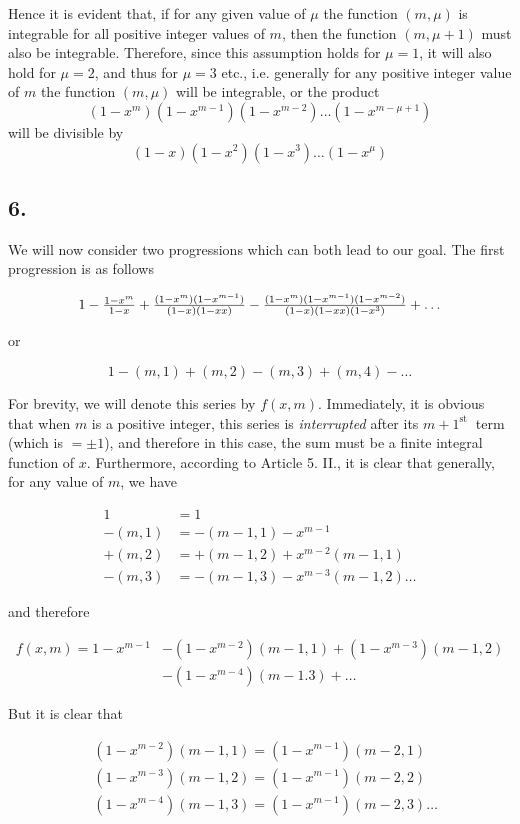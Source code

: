 \documentclass[twoside,12pt, showframe]{memoir}
\let\oldfrac\frac
\def\frac#1#2{\mathchoice{\tfrac{#1}{#2}}{\oldfrac{#1}{#2}}{\genfrac{}{}{}{2}{#1}{#2\mathstrut}}{\genfrac{}{}{}{3}{#1}{#2\mathstrut}}}
\begin{document}
Hence it is evident that, if for any given value of \(\mu\) the function \(({m}, {\mu})\) is integrable for all positive integer values of \(m\), then the function \((m, \mu+1)\) must also be integrable. Therefore, since this assumption holds for \(\mu=1\), it will also hold for \(\mu=2\), and thus for \(\mu=3\) etc., i.e. generally for any positive integer value of \(m\) the function \((m, \mu)\) will be integrable, or the product
\[(1-x^{m})(1-x^{m-1})(1-x^{m-2}) \ldots(1-x^{m-\mu+1})\]
will be divisible by
\[(1-x)(1-x^{2})(1-x^{3}) \ldots(1-x^{\mu})\]
%

\subsection*{6.}

We will now consider two progressions which can both lead to our goal. The first progression is as follows

\[1-\frac{1-x^{m}}{1-x}+\frac{(1-x^{m})(1-x^{m-1})}{(1-x)(1-xx)}-\frac{(1-x^{m})(1-x^{m-1})(1-x^{m-2})}{(1-x)(1-xx)(1-x^{3})}+\ldots\]

or

\[1-(m, 1)+(m, 2)-(m, 3)+(m, 4)-\ldots\]

For brevity, we will denote this series by \(f(x, m)\). Immediately, it is obvious that when \(m\) is a positive integer, this series is \textit{interrupted} after its \({m+1}^{\text{st }}\) term (which is \(= \pm 1\)), and therefore in this case, the sum must be a finite integral function of \(x\). Furthermore, according to Article 5. II., it is clear that generally, for any value of \(m\), we have

\[\begin{aligned}
1 & =1 \\
-(m, 1) & =-(m-1,1)-x^{m-1} \\
+(m, 2) & =+(m-1,2)+x^{m-2}(m-1,1) \\
-(m, 3) & =-(m-1,3)-x^{m-3}(m-1,2) \ldots
\end{aligned}\]

and therefore

\[\begin{aligned}
f(x, m)=1-x^{m-1}&-(1-x^{m-2})(m-1,1)+(1-x^{m-3})(m-1,2) \\
&-(1-x^{m-4})(m-1.3)+\ldots
\end{aligned}\]

But it is clear that

\[\begin{aligned}
& (1-x^{m-2})(m-1,1)=(1-x^{m-1})(m-2,1) \\
& (1-x^{m-3})(m-1,2)=(1-x^{m-1})(m-2,2) \\
& (1-x^{m-4})(m-1,3)=(1-x^{m-1})(m-2,3) \ldots
\end{aligned}\]
\end{document}
